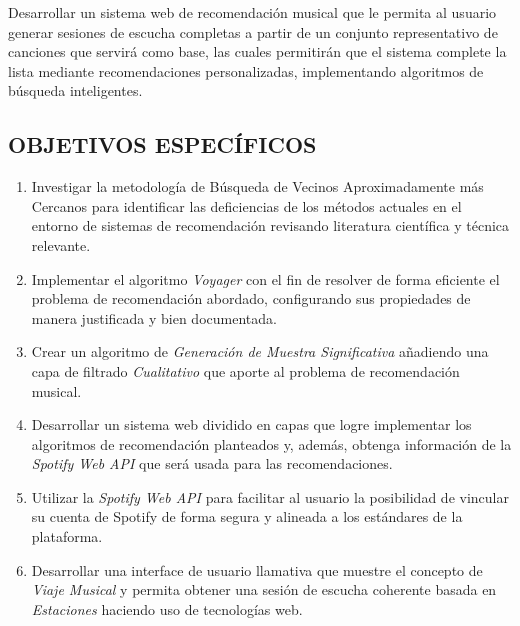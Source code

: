 Desarrollar un sistema web de recomendación musical  que le permita al usuario generar sesiones de escucha completas a partir de un conjunto representativo de canciones que servirá como base, las cuales permitirán que el sistema complete la lista mediante recomendaciones personalizadas, implementando algoritmos de búsqueda inteligentes.


\subsection*{OBJETIVOS ESPECÍFICOS}

\begin{enumerate}
    \item Investigar la metodología de Búsqueda de Vecinos Aproximadamente más Cercanos para identificar las deficiencias de los métodos actuales en el entorno de sistemas de recomendación revisando literatura científica y técnica relevante.
    
     \item Implementar el algoritmo \textit{Voyager} con el fin de resolver de forma eficiente el problema de recomendación abordado, configurando sus propiedades de manera justificada y bien documentada.

    \item Crear un algoritmo de \textit{Generación de Muestra Significativa} añadiendo una capa de filtrado \textit{Cualitativo} que aporte al problema de recomendación musical. 
    
    \item Desarrollar un sistema web dividido en capas que logre implementar los algoritmos de recomendación planteados y, además, obtenga información de la \textit{Spotify Web API} que será usada para las recomendaciones. 
    
    \item Utilizar la \textit{Spotify Web API} para facilitar al usuario la posibilidad de vincular su cuenta de Spotify de forma segura y alineada a los estándares de la plataforma.
    
    \item Desarrollar una interface de usuario llamativa que muestre el concepto de \textit{Viaje Musical} y permita obtener una sesión de escucha coherente basada en \textit{Estaciones} haciendo uso de tecnologías web.

\end{enumerate}